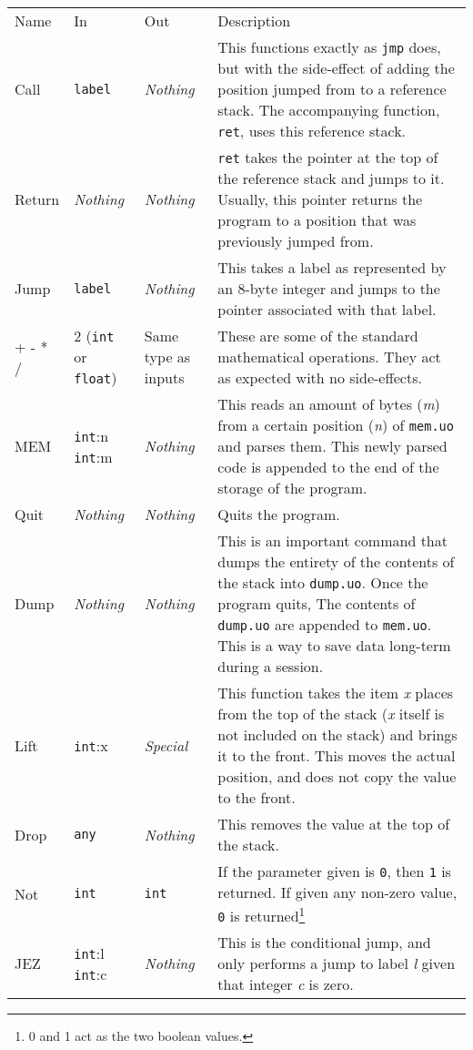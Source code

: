 \documentclass[12pt]{report}
\begin{document}
  \begin{longtable}{ l | l | l || p{6cm} }
  Name & In & Out & Description \\
  Call & \verb|label| & \emph{Nothing} & This functions exactly as \verb|jmp| does,
  but with the side-effect of adding the position jumped from to a reference stack.
  The accompanying function, \verb|ret|, uses this reference stack. \\
  Return & \emph{Nothing} & \emph{Nothing} & \verb|ret| takes the pointer at the
  top of the reference stack and jumps to it.  Usually, this pointer returns the
  program to a position that was previously jumped from. \\
  Jump & \verb|label| & \emph{Nothing} & This takes a label as represented by an
  8-byte integer and jumps to the pointer associated with that label. \\
  + - * / & 2 (\verb|int| or \verb|float|) & Same type as inputs &
  These are some of the standard mathematical operations.  They act as expected with
  no side-effects. \\
  MEM & \verb|int|:n \verb|int|:m & \emph{Nothing} & This reads an amount of bytes
  (\emph{m}) from a certain position (\emph{n}) of \verb|mem.uo| and parses
  them.  This newly parsed code is appended to the end of the storage of the
  program. \\
  Quit & \emph{Nothing} & \emph{Nothing} & Quits the program. \\
  Dump & \emph{Nothing} & \emph{Nothing} & This is an important command that dumps
  the entirety of the contents of the stack into \verb|dump.uo|.  Once the program
  quits, The contents of \verb|dump.uo| are appended to \verb|mem.uo|.  This is a way
  to save data long-term during a session. \\
  Lift & \verb|int|:x & \emph{Special} & This function takes the item \emph{x}
  places from the top of the stack (\emph{x} itself is not included on the stack) and
  brings it to the front.  This moves the actual position, and does not copy the
  value to the front. \\
  Drop & \verb|any| & \emph{Nothing} & This removes the value at the top of the
  stack. \\
  Not & \verb|int| & \verb|int| & If the parameter given is \verb|0|, then
  \verb|1| is returned.  If given any non-zero value, \verb|0| is returned\footnote{0
  and 1 act as the two boolean values.} \\
  JEZ & \verb|int|:l \verb|int|:c & \emph{Nothing} & This is the conditional jump, and
  only performs a jump to label \emph{l} given that integer \emph{c} is zero. \\
  \end{longtable}
\end{document}
